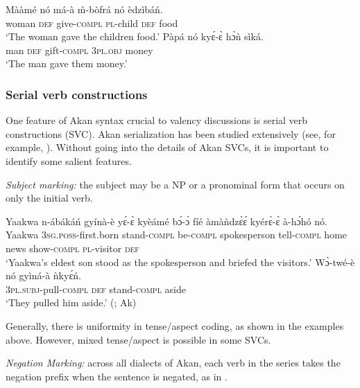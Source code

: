 \documentclass[output=paper]{langsci/langscibook}
\begin{document}
\ea\label{ex:18.osam}
\ea\label{ex:18a.osam}
\gll  Mààmé    nó  má-à    \`{m}-bòfrá  nó  èdzìbáń.\\
       woman    \textsc{def}  give-\textsc{compl}  \textsc{pl}-child  \textsc{def}  food\\
\glt   `The woman gave the children food.'
\ex\label{ex:18b.osam}
\gll   Pàpá  nó  kyɛ́-ɛ̀    hɔ̀ǹ    sìká.\\
       man  \textsc{def}  gift-\textsc{compl}  3\textsc{pl}.\textsc{obj}  money\\
\glt   `The man gave them money.'  
\z 
\z 


\subsubsection{Serial verb constructions}\label{§2.3.4:serial.osam}

One feature of Akan syntax crucial to valency discussions is serial verb constructions (\textsc{SVC}). Akan serialization has been studied extensively (see, for example, \citealt{lord1973,schachter1974,essilfie1977,forson1990,osam1994a,osam1994b,osam1997,osam2004,osam2014,agyeman2002,hellanetal2003,kambon2012}). Without going into the details of Akan SVCs, it is important to identify some salient features.

\textit{Subject marking:} the subject may be a NP or a pronominal form that occurs on only the initial verb. 

\ea\label{ex:19.osam}
\ea\label{ex:19a.osam}
\gll   Yaakwa  n-ábákáń     gyínà-è  yɛ́-ɛ̀ kyèámé bɔ́-ɔ̀      fíé   àmàǹdzɛ̀ɛ́  kyérɛ̀-ɛ̀    à-hɔ́hó    nó.\\
       Yaakwa  \textsc{3sg.poss}-first.born  stand-\textsc{compl}  be-\textsc{compl}   spokesperson tell-\textsc{compl}  home  news    show-\textsc{compl}  \textsc{pl}-visitor  \textsc{def}\\
\glt   `Yaakwa's eldest son stood as the spokesperson and briefed the visitors.' \citep[83]{krampah1970}
\ex\label{ex:19b.osam}
\gll   Wɔ̀-twé-è    nó  gyìná-à  ǹkyɛ́ń.\\
       \textsc{3pl.subj}-pull\textsc{-compl}  \textsc{def}  stand-\textsc{compl}  aside\\
\glt   `They pulled him aside.' (\citealt[31]{adi1973}; Ak)
\z 
\z 


Generally, there is uniformity in tense/aspect coding, as shown in the examples above. However, mixed tense/aspect is possible in some SVCs. 


\textit{Negation Marking:} across all dialects of Akan, each verb in the series takes the negation prefix when the sentence is negated, as in . 
\end{document}
